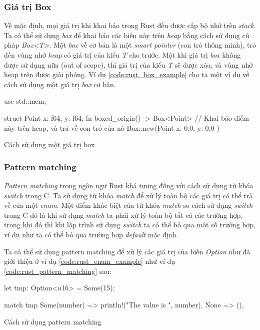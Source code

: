 \subsubsection{Giá trị Box}
Về mặc định, mọi giá trị khi khai báo trong Rust đều được cấp bộ nhớ trên \emph{stack}.
Ta có thể sử dụng \emph{box} để khai báo các biến này trên \emph{heap} bằng cách sử dụng cú pháp \emph{Box<T>}.
Một \emph{box} về cơ bản là một \emph{smart pointer} (con trỏ thông minh), trỏ đến vùng nhớ \emph{heap} có giá trị của kiểu \emph{T} cho trước.
Một khi giá trị \emph{box} không được sử dụng nữa (out of scope), thì giá trị của kiểu \emph{T} sẽ được xóa, và vùng nhớ heap trên được giải phóng.
Ví dụ \ref{code:rust_box_example} cho ta một ví dụ về cách sử dụng một giá trị \emph{box} cơ bản.

\begin{listing}
\begin{rustcode}
use std::mem;

struct Point {
    x: f64,
    y: f64,
}
fn boxed_origin() -> Box<Point> {
    // Khai báo điểm này trên heap, và trả về con trỏ của nó
    Box::new(Point { x: 0.0, y: 0.0 })
}
\end{rustcode}
\caption{Cách sử dụng một giá trị box}
\label{code:rust_box_example}
\end{listing}

\subsubsection{Pattern matching}\label{pattern_matching}
\emph{Pattern matching} trong ngôn ngữ Rust khá tương đồng với cách sử dụng từ khóa \emph{switch} trong C.
Ta sử dụng từ khóa \emph{match} để xử lý toàn bộ các giá trị có thể trả về của một \emph{enum}.
Một điểm khác biệt của từ khóa \emph{match} so cách sử dụng \emph{switch} trong C đó là khi sử dụng \emph{match} ta phải xử lý toàn bộ tất cả các trường hợp, trong khi đó thì khi lập trình sử dụng \emph{switch} ta có thể bỏ qua một số trường hợp, ví dụ như ta có thể bỏ qua trường hợp \emph{default} mặc định.

Ta có thể sử dụng pattern matching để xử lý các giá trị của biến \emph{Option} như đã giới thiệu ở ví dụ \ref{code:rust_enum_example} như ví dụ \ref{code:rust_pattern_matching} sau:
\begin{listing}
\begin{rustcode}
let tmp: Option<u16> = Some(15);

match tmp {
  Some(number) => println!("The value is {}", number),
  None => (),
}
\end{rustcode}
\caption{Cách sử dụng pattern matching}
\label{code:rust_pattern_matching}
\end{listing}

